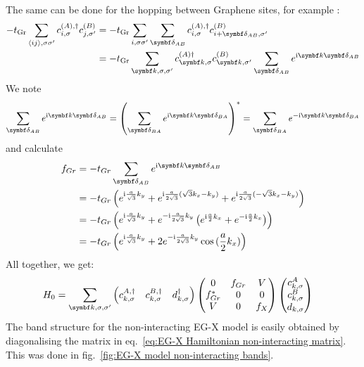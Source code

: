 \documentclass[../main.tex]{subfiles}
\begin{document}
	The same can be done for the hopping between Graphene sites, for example :
	\begin{align}
		-t_{\mathrm{Gr}} \sum_{\langle ij \rangle, \sigma \sigma^{\prime}} c_{i, \sigma}^{(A), \dagger} c_{j, \sigma^{\prime}}^{(B)}
		&= -t_{\mathrm{Gr}} \sum_{i, \sigma \sigma^{\prime}} \sum_{\vb{\delta}_{AB}} c_{i, \sigma}^{(A), \dagger} c_{i + \vb{\delta}_{AB} , \sigma^{\prime}}^{(B)} \\
		&= -t_{\mathrm{Gr}} \sum_{\vb{k}, \sigma, \sigma^{\prime}}  c_{\vb{k}, \sigma}^{(A) \dagger} c_{\vb{k}, \sigma^{\prime}}^{(B)} \sum_{\vb{\delta}_{AB}} e^{\iu \vb{k} \vb{\delta}_{AB}}
	\end{align}
	We note 
	\begin{align}
		\sum_{\vb{\delta}_{AB}} e^{\iu \vb{k} \vb{\delta}_{AB}} = \left( \sum_{\vb{\delta}_{BA}} e^{\iu \vb{k} \vb{\delta}_{BA}} \right)^* = \sum_{\vb{\delta}_{BA}} e^{-\iu \vb{k} \vb{\delta}_{BA}}
	\end{align}
	and calculate
	\begin{align}
		f_{Gr} &= -t_{Gr} \sum_{\vb{\delta}_{AB}} e^{\iu \vb{k} \vb{\delta}_{AB}} \\
		&= -t_{Gr} \left(
		e^{\iu \frac{a}{\sqrt{3}} k_y} +
		e^{\iu \frac{a}{2\sqrt{3}} (\sqrt{3} k_x - k_y)} +
		e^{\iu \frac{a}{2\sqrt{3}} (-\sqrt{3} k_x - k_y)} \right) \\
		&= -t_{Gr} \left(
		e^{\iu \frac{a}{\sqrt{3}} k_y} +
		e^{-\iu \frac{a}{2\sqrt{3}} k_y} \left(
		e^{\iu \frac{a}{2} k_x} + e^{-\iu \frac{a}{2} k_x}
		\right) \right) \\
		&= -t_{Gr} \left(
		e^{\iu \frac{a}{\sqrt{3}} k_y} +
		2 e^{-\iu \frac{a}{2\sqrt{3}} k_y}
		\cos{(\frac{a}{2} k_x)} \right)
	\end{align}
	All together, we get:
	\begin{align}
		H_0 &= \sum_{\vb{k}, \sigma, \sigma^{\prime}} \begin{pmatrix} c_{k, \sigma}^{A, \dagger} & c_{k, \sigma}^{B, \dagger} & d_{k, \sigma}^{\dagger} \end{pmatrix}
		\begin{pmatrix}
			0 & f_{Gr} & V \\
			f_{Gr}^* & 0 & 0 \\
			V & 0 & f_{X}
		\end{pmatrix} \begin{pmatrix} c_{k, \sigma}^{A} \\ c_{k, \sigma}^{B} \\ d_{k, \sigma} \end{pmatrix}
		\label{eq:EG-X Hamiltonian non-interacting matrix appendix}
	\end{align}
	The band structure for the non-interacting EG-X model is easily obtained by diagonalising the matrix in eq.~\ref{eq:EG-X Hamiltonian non-interacting matrix}.
	This was done in fig.~\ref{fig:EG-X model non-interacting bands}.
	
\end{document}
